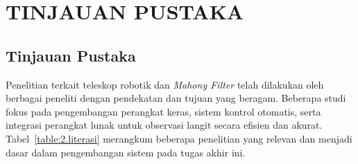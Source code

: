 \cleardoublepage
\chapter{TINJAUAN PUSTAKA} \label{Bab II}

\section{Tinjauan Pustaka} \label{II.Tinjauan}
Penelitian terkait teleskop robotik dan \textit{Mahony Filter} telah dilakukan oleh berbagai peneliti dengan pendekatan dan tujuan yang beragam. Beberapa studi fokus pada pengembangan perangkat keras, sistem kontrol otomatis, serta integrasi perangkat lunak untuk observasi langit secara efisien dan akurat. Tabel~\ref{table:2.literasi} merangkum beberapa penelitian yang relevan dan menjadi dasar dalam pengembangan sistem pada tugas akhir ini. \par
